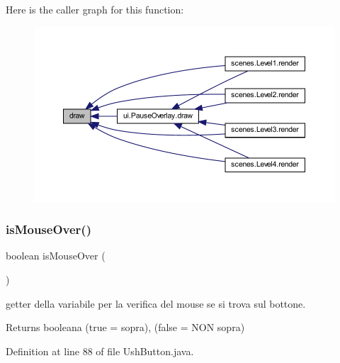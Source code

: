 Here is the caller graph for this function\+:\nopagebreak
\begin{figure}[H]
\begin{center}
\leavevmode
\includegraphics[width=350pt]{classui_1_1_ush_button_a72fe1ffca978e99fd16994a10e7f8051_icgraph}
\end{center}
\end{figure}
\mbox{\label{classui_1_1_ush_button_a2deebd864f1c01a6d81238349c929885}} 
\subsubsection{\texorpdfstring{is\+Mouse\+Over()}{isMouseOver()}}
{\footnotesize\ttfamily boolean is\+Mouse\+Over (\begin{DoxyParamCaption}{ }\end{DoxyParamCaption})}



getter della variabile per la verifica del mouse se si trova sul bottone. 

\begin{DoxyReturn}{Returns}
booleana (true = sopra), (false = N\+ON sopra) 
\end{DoxyReturn}


Definition at line 88 of file Ush\+Button.\+java.

\mbox{\label{classui_1_1_ush_button_ad47389f2ab3067af3626db75a6b3b09e}} 
